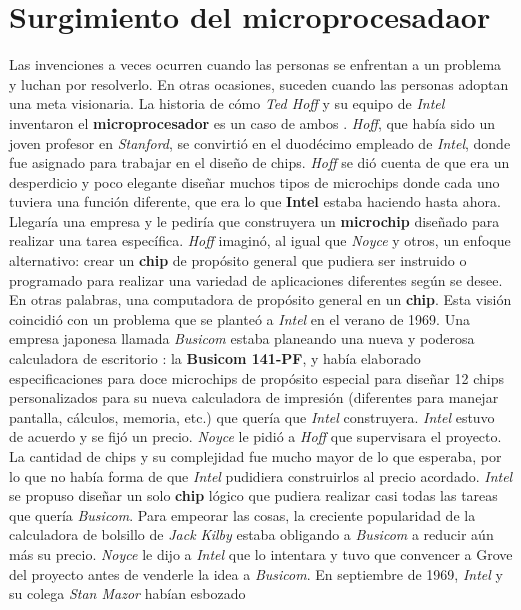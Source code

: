 \section{Surgimiento del microprocesadaor}
Las invenciones a veces ocurren cuando las personas se enfrentan a un problema y luchan por resolverlo. En otras ocasiones, suceden 
cuando las personas adoptan una meta visionaria. La historia de cómo \emph{Ted Hoff} y su equipo de \emph{Intel} inventaron el \textbf
{microprocesador} es un caso de ambos . \emph{Hoff}, que había sido un joven profesor en \emph{Stanford}, se
convirtió en el duodécimo empleado de \emph{Intel}, donde fue asignado para trabajar en el diseño de chips. \emph{Hoff} se dió cuenta de que era un
desperdicio y poco elegante diseñar muchos tipos de microchips donde cada uno tuviera una función diferente,  que era lo que \textbf
{Intel} estaba haciendo hasta ahora. Llegaría una empresa y le pediría que construyera un \textbf{microchip} diseñado para realizar una tarea
específica. \emph{Hoff} imaginó, al igual que \emph{Noyce} y otros, un enfoque alternativo: crear un \textbf{chip} de propósito general que pudiera
ser instruido o programado para realizar una variedad de aplicaciones diferentes según se desee. En otras palabras, una computadora de propósito
general en un \textbf{chip}. Esta visión coincidió con un problema que se planteó a \emph{Intel} en el verano de 1969. Una empresa japonesa llamada
\emph {Busicom} estaba planeando una nueva y poderosa calculadora de escritorio : la \textbf{Busicom 141-PF}, y había elaborado especificaciones para
doce microchips de propósito especial para diseñar 12 chips personalizados para su nueva calculadora de impresión (diferentes para manejar pantalla,
cálculos, memoria, etc.) que quería que \emph{Intel} construyera. \emph{Intel} estuvo de acuerdo y se fijó un precio. \emph{Noyce} le pidió a \emph
{Hoff} que supervisara el proyecto. La cantidad de chips y su complejidad fue mucho mayor de lo que esperaba, por lo que no había forma de que \emph
{Intel} pudidiera construirlos al precio acordado. \emph{Intel} se propuso diseñar un solo \textbf{chip} lógico que pudiera realizar casi todas las
tareas que quería \emph{Busicom}. Para empeorar las cosas,  la creciente popularidad de la calculadora de bolsillo de \emph{Jack Kilby} estaba
obligando a \emph{Busicom} a reducir aún más su precio. \emph{Noyce} le dijo a \emph{Intel} que lo intentara y tuvo que convencer a Grove del
proyecto antes de venderle la idea a \emph{Busicom}. En septiembre de 1969, \emph{Intel} y su colega \emph{Stan Mazor} habían esbozado
